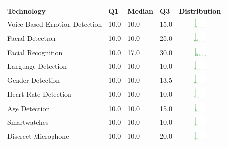 \begin{table}[H!]
\begin{center}
\small
\begin{tabular}{| p{2cm} | p{1cm} | p{1cm} | p{1cm} | c |}
\hline
Technology & Q1 &  Median & Q3 & Distribution  \\ 
\hline
Voice Based Emotion Detection  & 10.0 & 10.0 & 15.0 & \includegraphics[width = 2cm, height = 0.5cm]{tables/voicebasedemotiondetectionrisk} \\ 
Facial Detection  & 10.0 & 10.0 & 25.0 & \includegraphics[width = 2cm, height = 0.5cm]{tables/facialdetectionrisk} \\ 
Facial Recognition  & 10.0 & 17.0 & 30.0 & \includegraphics[width = 2cm, height = 0.5cm]{tables/facialrecognitionrisk} \\ 
Language Detection  & 10.0 & 10.0 & 10.0 & \includegraphics[width = 2cm, height = 0.5cm]{tables/languagedetectionrisk} \\ 
Gender Detection  & 10.0 & 10.0 & 13.5 & \includegraphics[width = 2cm, height = 0.5cm]{tables/genderdetectionrisk} \\ 
Heart Rate Detection  & 10.0 & 10.0 & 10.0 & \includegraphics[width = 2cm, height = 0.5cm]{tables/heartratedetectionrisk} \\ 
Age Detection  & 10.0 & 10.0 & 15.0 & \includegraphics[width = 2cm, height = 0.5cm]{tables/agedetectionrisk} \\ 
Smartwatches  & 10.0 & 10.0 & 10.0 & \includegraphics[width = 2cm, height = 0.5cm]{tables/smartwatchesrisk} \\ 
Discreet Microphone  & 10.0 & 10.0 & 20.0 & \includegraphics[width = 2cm, height = 0.5cm]{tables/discreetmicrophonerisk} \\ 

\end{tabular}
\end{center}
\end{table}
